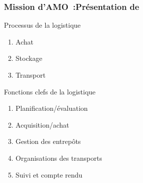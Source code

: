 \begin{frame}
\frametitle {Mission d'AMO~:Présentation de \mo} \pause
\begin{block}{Processus de la logistique} \pause
\begin{enumerate}
\item Achat \pause
\item Stockage \pause
\item Transport
\end{enumerate}
\end{block}

\begin{block}{Fonctions clefs de la logistique} \pause
\begin{enumerate}
\item Planification/évaluation \pause
\item Acquisition/achat \pause
\item Gestion des entrepôts \pause
\item Organisations des transports \pause
\item Suivi et compte rendu
\end{enumerate}
\end{block}

\end{frame}



